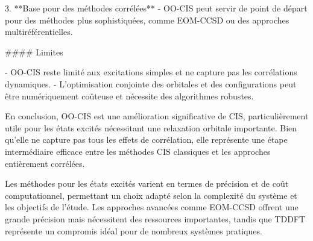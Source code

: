 \documentclass[12pt,a4paper]{report}
\begin{document}
\begin{markdown}
3. **Base pour des méthodes corrélées**
   - OO-CIS peut servir de point de départ pour des méthodes plus sophistiquées, comme EOM-CCSD ou des approches multiréférentielles.

#### Limites

- OO-CIS reste limité aux excitations simples et ne capture pas les corrélations dynamiques.
- L'optimisation conjointe des orbitales et des configurations peut être numériquement coûteuse et nécessite des algorithmes robustes.

En conclusion, OO-CIS est une amélioration significative de CIS, particulièrement utile pour les états excités nécessitant une relaxation orbitale importante. Bien qu'elle ne capture pas tous les effets de corrélation, elle représente une étape intermédiaire efficace entre les méthodes CIS classiques et les approches entièrement corrélées. 




Les méthodes pour les états excités varient en termes de précision et de coût computationnel, permettant un choix adapté selon la complexité du système et les objectifs de l'étude. Les approches avancées comme EOM-CCSD offrent une grande précision mais nécessitent des ressources importantes, tandis que TDDFT représente un compromis idéal pour de nombreux systèmes pratiques.

\end{markdown}
\end{document}
